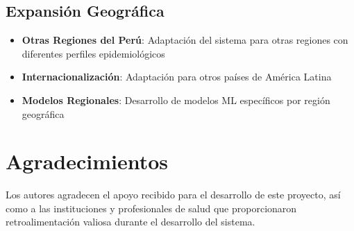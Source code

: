 \documentclass[12pt,a4paper]{article}
\begin{document}
\subsection{Expansión Geográfica}

\begin{itemize}
    \item \textbf{Otras Regiones del Perú}: Adaptación del sistema para otras regiones con diferentes perfiles epidemiológicos
    \item \textbf{Internacionalización}: Adaptación para otros países de América Latina
    \item \textbf{Modelos Regionales}: Desarrollo de modelos ML específicos por región geográfica
\end{itemize}

\section{Agradecimientos}

Los autores agradecen el apoyo recibido para el desarrollo de este proyecto, así como a las instituciones y profesionales de salud que proporcionaron retroalimentación valiosa durante el desarrollo del sistema.
\end{document}
